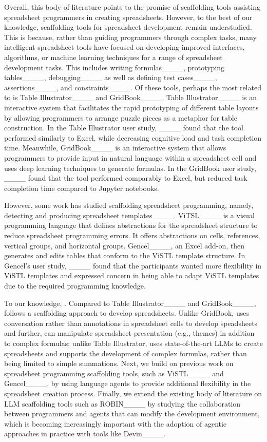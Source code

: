 Overall, this body of literature points to the promise of scaffolding tools assisting spreadsheet programmers in creating spreadsheets.
However, to the best of our knowledge, scaffolding tools for spreadsheet development remain understudied.
This is because, rather than guiding programmers through complex tasks, many intelligent spreadsheet tools have focused on developing improved interfaces, algorithms, or machine learning techniques for a range of spreadsheet development tasks.
This includes writing formulas____, prototyping tables____, debugging____ as well as defining test cases____, assertions____, and constraints____.
Of these tools, perhaps the most related to \tool is Table Illustrator____ and GridBook____.
Table Illustrator____ is an interactive system that facilitates the rapid prototyping of different table layouts by allowing programmers to arrange puzzle pieces as a metaphor for table construction.
In the Table Illustrator user study, ____ found that the tool performed similarly to Excel, while decreasing cognitive load and task completion time.
Meanwhile, GridBook____ is an interactive system that allows programmers to provide input in natural language within a spreadsheet cell and uses deep learning techniques to generate formulas.
In the GridBook user study, ____ found that the tool performed comparably to Excel, but reduced task completion time compared to Jupyter notebooks.

However, some work has studied scaffolding spreadsheet programming, namely, detecting and producing spreadsheet templates____.
ViTSL____ is a visual programming language that defines abstractions for the spreadsheet structure to reduce spreadsheet programming errors.
It offers abstractions on cells, references, vertical groups, and horizontal groups.
Gencel____, an Excel add-on, then generates and edits tables that conform to the ViSTL template structure.
In Gencel's user study, ____ found that the participants wanted more flexibility in ViSTL templates and expressed concern in being able to adapt ViSTL templates due to the required programming knowledge.

To our knowledge, .
Compared to Table Illustrator____ and GridBook____, \tool follows a scaffolding approach to develop spreadsheets. 
Unlike GridBook, \tool uses conversation rather than annotations in spreadsheet cells to develop speadsheets and further, can manipulate spreadsheet presentation (e.g., themes) in addition to complex formulas; unlike Table Illustrator, \tool uses state-of-the-art LLMs to create spreadsheets and supports the development of complex formulas, rather than being limited to simple summations.
Next, we build on previous work on spreadsheet programming scaffolding tools, such as ViSTL____ and Gencel____, by using language agents to provide additional flexibility in the spreadsheet creation process.
Finally, we extend the existing body of literature on LLM scaffolding tools such as ROBIN____ by studying the collaboration between programmers and agents that can modify the development environment, which is becoming increasingly important with the adoption of agentic approaches in practice with tools like Devin____. 

